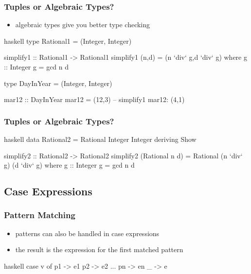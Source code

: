 \documentclass[dvipsnames]{beamer}
\theoremstyle{plain}
\begin{document}
\begin{frame}[fragile]
  \frametitle{Tuples or Algebraic Types?}

  \begin{itemize}
    \item algebraic types give you better type checking
  \end{itemize}

  \begin{exampleblock}{}
    \begin{pygments}{haskell}
type Rational1 = (Integer, Integer)

simplify1 :: Rational1 -> Rational1
simplify1 (n,d) = (n `div` g,d `div` g)
  where
    g :: Integer
    g = gcd n d

type DayInYear = (Integer, Integer)

mar12 :: DayInYear
mar12 = (12,3)
-- simplify1 mar12: (4,1)
    \end{pygments}
  \end{exampleblock}
\end{frame}

\begin{frame}[fragile]
  \frametitle{Tuples or Algebraic Types?}

  \begin{exampleblock}{}
    \begin{pygments}{haskell}
data Rational2 = Rational Integer Integer
                 deriving Show

simplify2 :: Rational2 -> Rational2
simplify2 (Rational n d) =
  Rational (n `div` g) (d `div` g)
    where
      g :: Integer
      g = gcd n d
    \end{pygments}
  \end{exampleblock}
\end{frame}

\subsection{Case Expressions}

\begin{frame}[fragile]
  \frametitle{Pattern Matching}

  \begin{itemize}
    \item patterns can also be handled in case expressions
    \item the result is the expression for the first matched pattern
  \end{itemize}

  \begin{block}{}
    \begin{pygments}{haskell}
case v of
  p1 -> e1
  p2 -> e2
  ...
  pn -> en
  _ -> e
    \end{pygments}
  \end{block}
\end{frame}
\end{document}
